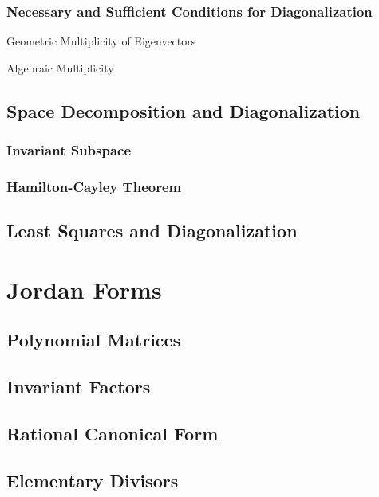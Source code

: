 \documentclass[11pt]{elegantbook}
\begin{document}
\subsection{Necessary and Sufficient Conditions for Diagonalization}
\begin{leftbarTitle}{Geometric Multiplicity of Eigenvectors}\end{leftbarTitle}
\begin{leftbarTitle}{Algebraic Multiplicity}\end{leftbarTitle}


\section{Space Decomposition and Diagonalization}

\subsection{Invariant Subspace}

\subsection{Hamilton-Cayley Theorem}

\section{Least Squares and Diagonalization}

\chapter{Jordan Forms}
\section{Polynomial Matrices}

\section{Invariant Factors}

\section{Rational Canonical Form}

\section{Elementary Divisors}
\end{document}
